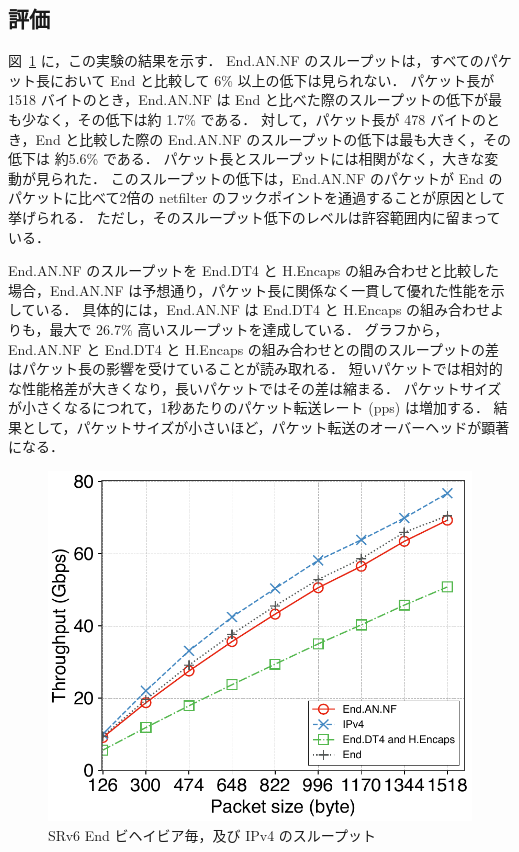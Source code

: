 \subsection{評価}
\label{ssec:thru-size.eval}
図~\ref{fig:size-thru} に，この実験の結果を示す．
End.AN.NF のスループットは，すべてのパケット長において End と比較して 6\% 以上の低下は見られない．
パケット長が 1518 バイトのとき，End.AN.NF は End と比べた際のスループットの低下が最も少なく，その低下は約 1.7\% である．
対して，パケット長が 478 バイトのとき，End と比較した際の End.AN.NF のスループットの低下は最も大きく，その低下は 約5.6\% である．
パケット長とスループットには相関がなく，大きな変動が見られた．
このスループットの低下は，End.AN.NF のパケットが End のパケットに比べて2倍の netfilter のフックポイントを通過することが原因として挙げられる．
ただし，そのスループット低下のレベルは許容範囲内に留まっている．

End.AN.NF のスループットを End.DT4 と H.Encaps の組み合わせと比較した場合，End.AN.NF は予想通り，パケット長に関係なく一貫して優れた性能を示している．
具体的には，End.AN.NF は End.DT4 と H.Encaps の組み合わせよりも，最大で 26.7\% 高いスループットを達成している．
グラフから，End.AN.NF と End.DT4 と H.Encaps の組み合わせとの間のスループットの差はパケット長の影響を受けていることが読み取れる．
短いパケットでは相対的な性能格差が大きくなり，長いパケットではその差は縮まる．
パケットサイズが小さくなるにつれて，1秒あたりのパケット転送レート (pps) は増加する．
結果として，パケットサイズが小さいほど，パケット転送のオーバーヘッドが顕著になる．

\begin{figure}[t]
    \centering
    \includegraphics[width=0.95\linewidth]{img/size-throughput.pdf}
    \caption{SRv6 End ビヘイビア毎，及び IPv4 のスループット}
    \label{fig:size-thru}
\end{figure}


